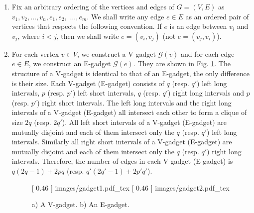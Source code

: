\documentclass[11pt]{article}
\begin{document}
\begin{enumerate}
 \item Fix an arbitrary ordering of the vertices and edges of $G = (V, E)$ as $v_1, v_2, \ldots, v_n, e_1, e_2,$ $\ldots, e_m$. We shall write any edge $e \in E$ as an ordered pair of vertices that respects the following convention. If $e$ is an edge between $v_i$ and $v_j$, where $i < j$, then we shall write $e = (v_i, v_j)$ (not $e = (v_j, v_i)$).
 
 
 \item For each vertex $v \in V$, we construct a V-gadget $\mathcal{G}(v)$ and for each edge $e \in E$, we construct an E-gadget $\mathcal{G}(e)$. They are shown in Fig. \ref{fig: gadgets}. The structure of a V-gadget is identical to that of an E-gadget, the only difference is their size. Each V-gadget (E-gadget) consists of $q$ (resp. $q'$) left long intervals, $p$ (resp. $p'$) left short intervals, $q$ (resp. $q'$) right long intervals and $p$ (resp. $p'$) right short intervals. The left long intervals and the right long intervals of a V-gadget (E-gadget) all intersect each other to form a clique of size $2q$ (resp. $2q'$). All left short intervals of a V-gadget (E-gadget) are mutually disjoint and each of them intersect only the $q$ (resp. $q'$) left long intervals. Similarly all right short intervals of a V-gadget (E-gadget) are mutually disjoint and each of them intersect only the $q$ (resp. $q'$) right long intervals. Therefore, the number of edges in each V-gadget (E-gadget) is $q(2q-1) + 2pq$ (resp.  $q'(2q'-1) + 2p'q'$). 
 





 
   \begin{figure}[h!]
\centering
{}
[
    0.46\textwidth %
]
{
    \fontsize{8pt}{8pt}\selectfont%
    \def\svgwidth{0.46\textwidth}
    {images/gadget1.pdf_tex}
}
\hfill %
[
    0.46\textwidth %
]
{
    \fontsize{8pt}{8pt}\selectfont
    \def\svgwidth{0.46\textwidth}
    {images/gadget2.pdf_tex}
}


\caption[Short Caption]{a)  A V-gadget. b)  An E-gadget.}
\label{fig: gadgets}
\end{figure}







\end{enumerate}
\end{document}

